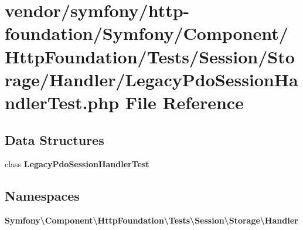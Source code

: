 \section{vendor/symfony/http-\/foundation/\+Symfony/\+Component/\+Http\+Foundation/\+Tests/\+Session/\+Storage/\+Handler/\+Legacy\+Pdo\+Session\+Handler\+Test.php File Reference}
\label{_legacy_pdo_session_handler_test_8php}
\subsection*{Data Structures}
\begin{DoxyCompactItemize}
\item 
class {\bf Legacy\+Pdo\+Session\+Handler\+Test}
\end{DoxyCompactItemize}
\subsection*{Namespaces}
\begin{DoxyCompactItemize}
\item 
 {\bf Symfony\textbackslash{}\+Component\textbackslash{}\+Http\+Foundation\textbackslash{}\+Tests\textbackslash{}\+Session\textbackslash{}\+Storage\textbackslash{}\+Handler}
\end{DoxyCompactItemize}
